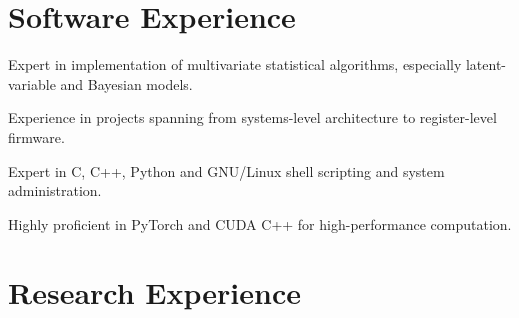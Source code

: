 \documentclass[letterpaper]{article}
\renewenvironment{itemize}{
  \begin{list}{}{
    \setlength{\leftmargin}{1.5em}
  }
}{
  \end{list}
}
\begin{document}
\section*{Software Experience}

\begin{itemize}
\item{
  Expert in implementation of multivariate statistical algorithms,
  especially latent-variable and Bayesian models.
}
\item{
  Experience in projects spanning from systems-level architecture to
  register-level firmware.
}
\item{
  Expert in C, C++, Python and GNU/Linux shell scripting and
  system administration.
}
\item{
  Highly proficient in PyTorch and CUDA C++ for high-performance
  computation.
}
\end{itemize}


\section*{Research Experience}
\end{document}

